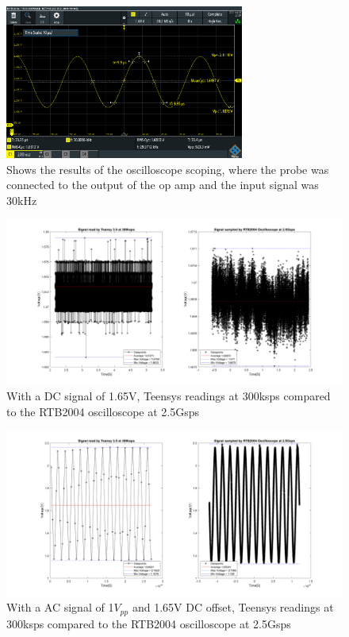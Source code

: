 \begin{figure}[h]
    \centering
    \includegraphics[width=0.7\textwidth]{graphics/30k10mvPP300ksamp.PNG}
    \caption{Shows the results of the oscilloscope scoping, where the probe was connected to the output of the op amp and the input signal was 30kHz}
    \label{fig:Oscillo30k300k}
\end{figure}




\begin{figure}[h]
    \centering
    \includegraphics[width=1.0\textwidth]{graphics/OscilloTeensyDC165Read.png}
    \caption{With a DC signal of 1.65V, Teensys readings at 300ksps compared to the RTB2004 oscilloscope at 2.5Gsps}
    \label{fig:OscilloCompTeensyDC}
\end{figure}


\begin{figure}[h]
    \centering
    \includegraphics[width=1.0\textwidth]{graphics/OscilloTeensyAC50k1vpp165voffpng.png}
    \caption{With a AC signal of 1$V_{pp}$ and 1.65V DC offset, Teensys readings at 300ksps compared to the RTB2004 oscilloscope at 2.5Gsps}
    \label{fig:OscilloCompTeensyAC}
\end{figure}


